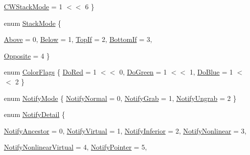 \begin{DoxyCompactItemize}
\hyperlink{namespace_tao_1_1_platform_1_1_x11_a1629b5fbafa3ee7f6e35e1073b1416a0}{CWStackMode} =  1 $<$$<$ 6
 \}
\item 
enum \hyperlink{namespace_tao_1_1_platform_1_1_x11_a65e46f815ab9acb6d61db3d389dda9ee}{StackMode} \{ \par
\hyperlink{namespace_tao_1_1_platform_1_1_x11_a65e46f815ab9acb6d61db3d389dda9ee}{Above} =  0, 
\hyperlink{namespace_tao_1_1_platform_1_1_x11_a65e46f815ab9acb6d61db3d389dda9ee}{Below} =  1, 
\hyperlink{namespace_tao_1_1_platform_1_1_x11_a65e46f815ab9acb6d61db3d389dda9ee}{TopIf} =  2, 
\hyperlink{namespace_tao_1_1_platform_1_1_x11_a65e46f815ab9acb6d61db3d389dda9ee}{BottomIf} =  3, 
\par
\hyperlink{namespace_tao_1_1_platform_1_1_x11_a65e46f815ab9acb6d61db3d389dda9ee}{Opposite} =  4
 \}
\item 
enum \hyperlink{namespace_tao_1_1_platform_1_1_x11_aac18f1931ae09ee4f546c1caefc8e7e5}{ColorFlags} \{ \hyperlink{namespace_tao_1_1_platform_1_1_x11_aac18f1931ae09ee4f546c1caefc8e7e5}{DoRed} =  1 $<$$<$ 0, 
\hyperlink{namespace_tao_1_1_platform_1_1_x11_aac18f1931ae09ee4f546c1caefc8e7e5}{DoGreen} =  1 $<$$<$ 1, 
\hyperlink{namespace_tao_1_1_platform_1_1_x11_aac18f1931ae09ee4f546c1caefc8e7e5}{DoBlue} =  1 $<$$<$ 2
 \}
\item 
enum \hyperlink{namespace_tao_1_1_platform_1_1_x11_af1e3565bb46d6739beef36dd83ece63b}{NotifyMode} \{ \hyperlink{namespace_tao_1_1_platform_1_1_x11_af1e3565bb46d6739beef36dd83ece63b}{NotifyNormal} =  0, 
\hyperlink{namespace_tao_1_1_platform_1_1_x11_af1e3565bb46d6739beef36dd83ece63b}{NotifyGrab} =  1, 
\hyperlink{namespace_tao_1_1_platform_1_1_x11_af1e3565bb46d6739beef36dd83ece63b}{NotifyUngrab} =  2
 \}
\item 
enum \hyperlink{namespace_tao_1_1_platform_1_1_x11_a284f97dad97b4ca8dd1e16bd10eee70c}{NotifyDetail} \{ \par
\hyperlink{namespace_tao_1_1_platform_1_1_x11_a284f97dad97b4ca8dd1e16bd10eee70c}{NotifyAncestor} =  0, 
\hyperlink{namespace_tao_1_1_platform_1_1_x11_a284f97dad97b4ca8dd1e16bd10eee70c}{NotifyVirtual} =  1, 
\hyperlink{namespace_tao_1_1_platform_1_1_x11_a284f97dad97b4ca8dd1e16bd10eee70c}{NotifyInferior} =  2, 
\hyperlink{namespace_tao_1_1_platform_1_1_x11_a284f97dad97b4ca8dd1e16bd10eee70c}{NotifyNonlinear} =  3, 
\par
\hyperlink{namespace_tao_1_1_platform_1_1_x11_a284f97dad97b4ca8dd1e16bd10eee70c}{NotifyNonlinearVirtual} =  4, 
\hyperlink{namespace_tao_1_1_platform_1_1_x11_a284f97dad97b4ca8dd1e16bd10eee70c}{NotifyPointer} =  5, 

\end{DoxyCompactItemize}
